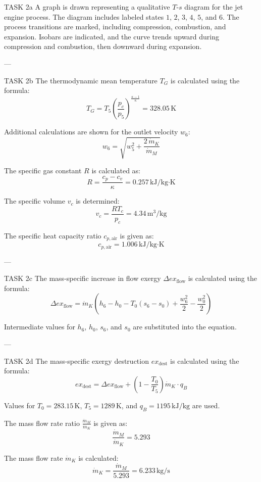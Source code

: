 TASK 2a  
A graph is drawn representing a qualitative \( T \)-\( s \) diagram for the jet engine process. The diagram includes labeled states \( 1 \), \( 2 \), \( 3 \), \( 4 \), \( 5 \), and \( 6 \). The process transitions are marked, including compression, combustion, and expansion. Isobars are indicated, and the curve trends upward during compression and combustion, then downward during expansion.

---

TASK 2b  
The thermodynamic mean temperature \( T_G \) is calculated using the formula:  
\[
T_G = T_5 \left( \frac{p_c}{p_5} \right)^{\frac{\kappa - 1}{\kappa}} = 328.05 \, \text{K}
\]

Additional calculations are shown for the outlet velocity \( w_6 \):  
\[
w_6 = \sqrt{w_5^2 + \frac{2 \, \dot{m}_K}{\dot{m}_M}}
\]

The specific gas constant \( R \) is calculated as:  
\[
R = \frac{c_p - c_v}{\kappa} = 0.257 \, \text{kJ/kg·K}
\]

The specific volume \( v_c \) is determined:  
\[
v_c = \frac{R T_c}{p_c} = 4.34 \, \text{m}^3/\text{kg}
\]

The specific heat capacity ratio \( c_{p,\text{air}} \) is given as:  
\[
c_{p,\text{air}} = 1.006 \, \text{kJ/kg·K}
\]

---

TASK 2c  
The mass-specific increase in flow exergy \( \Delta ex_{\text{flow}} \) is calculated using the formula:  
\[
\Delta ex_{\text{flow}} = \dot{m}_K \left( h_6 - h_0 - T_0 (s_6 - s_0) + \frac{w_6^2}{2} - \frac{w_0^2}{2} \right)
\]

Intermediate values for \( h_6 \), \( h_0 \), \( s_6 \), and \( s_0 \) are substituted into the equation.

---

TASK 2d  
The mass-specific exergy destruction \( ex_{\text{dest}} \) is calculated using the formula:  
\[
ex_{\text{dest}} = \Delta ex_{\text{flow}} + \left( 1 - \frac{T_0}{T_5} \right) \dot{m}_K \cdot q_B
\]

Values for \( T_0 = 283.15 \, \text{K} \), \( T_5 = 1289 \, \text{K} \), and \( q_B = 1195 \, \text{kJ/kg} \) are used.

The mass flow rate ratio \( \frac{\dot{m}_M}{\dot{m}_K} \) is given as:  
\[
\frac{\dot{m}_M}{\dot{m}_K} = 5.293
\]

The mass flow rate \( \dot{m}_K \) is calculated:  
\[
\dot{m}_K = \frac{\dot{m}_M}{5.293} = 6.233 \, \text{kg/s}
\]